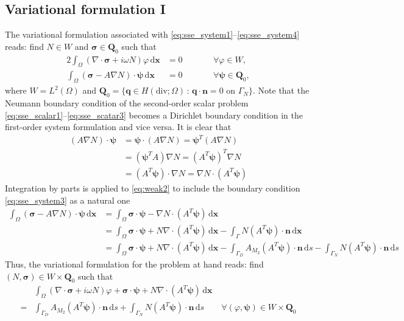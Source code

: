 \documentclass[11pt,a4paper]{article}
\begin{document}
\subsection{Variational formulation I}
The variational formulation associated with \eqref{eq:sse_system1}--\eqref{eq:sse_system4} reads: find $N\in W$ and $\boldsymbol{\sigma}\in\mathbf{Q}_0$ such that 
\begin{alignat}{2}
\int_\Omega\left(\nabla\cdot\boldsymbol{\sigma}+i\omega N\right)\varphi\,\mathrm{d}\mathbf{x}&=0 \qquad && \forall \varphi\in W,
\label{eq:weak1}\\
\int_\Omega\left(\boldsymbol{\sigma}-A\nabla N\right)\cdot\boldsymbol{\psi}\,\mathrm{d}\mathbf{x}&=0 \qquad && \forall \boldsymbol{\psi}\in \mathbf{Q}_0,
\label{eq:weak2}
\end{alignat}
where $W=L^2(\Omega)$ and $\mathbf{Q}_0=\{\mathbf{q}\in H(\text{div};\Omega)\,:\,\mathbf{q}\cdot\mathbf{n}=0 \text{ on }\Gamma_N\}$. Note that the Neumann boundary condition of the second-order scalar problem \eqref{eq:sse_scalar1}--\eqref{eq:sse_scatar3} becomes a Dirichlet boundary condition in the first-order system formulation and vice versa. It is clear that
\begin{align}
(A\nabla N)\cdot\boldsymbol{\psi}
&=\boldsymbol{\psi}\cdot(A\nabla N)
=\boldsymbol{\psi}^T(A\nabla N)\\
&=(\boldsymbol{\psi}^TA)\nabla N
=(A^T\boldsymbol{\psi})^T\nabla N\\
&=(A^T\boldsymbol{\psi})\cdot\nabla N
=\nabla N\cdot(A^T\boldsymbol{\psi})
\end{align}
Integration by parts is applied to \eqref{eq:weak2} to include the boundary condition \eqref{eq:sse_system3} as a natural one
\begin{align*}
\int_\Omega(\boldsymbol{\sigma}-A\nabla N)\cdot\boldsymbol{\psi}\,\mathrm{d}\mathbf{x}
&=\int_\Omega\boldsymbol{\sigma}\cdot\boldsymbol{\psi}-\nabla N\cdot(A^T\boldsymbol{\psi})\,\mathrm{d}\mathbf{x}\\
&=\int_\Omega\boldsymbol{\sigma}\cdot\boldsymbol{\psi}+N\nabla\cdot(A^T\boldsymbol{\psi})\,\mathrm{d}\mathbf{x}-\int_\Gamma N(A^T\boldsymbol{\psi})\cdot\mathbf{n}\,\mathrm{d}\mathbf{x}\\
&=\int_\Omega\boldsymbol{\sigma}\cdot\boldsymbol{\psi}+N\nabla\cdot(A^T\boldsymbol{\psi})\,\mathrm{d}\mathbf{x}-\int_{\Gamma_D} A_{M_2}(A^T\boldsymbol{\psi})\cdot\mathbf{n}\,\mathrm{d}s-\int_{\Gamma_N} N(A^T\boldsymbol{\psi})\cdot\mathbf{n}\,\mathrm{d}s
\end{align*}
Thus, the variational formulation for the problem at hand reads: find $(N,\boldsymbol{\sigma})\in W\times\mathbf{Q}_0$ such that
\begin{align}
&\int_\Omega\left(\nabla\cdot\boldsymbol{\sigma}+i\omega N\right)\varphi+\boldsymbol{\sigma}\cdot\boldsymbol{\psi}+N\nabla\cdot(A^T\boldsymbol{\psi})\,\mathrm{d}\mathbf{x}\\
=&\int_{\Gamma_D} A_{M_2}(A^T\boldsymbol{\psi})\cdot\mathbf{n}\,\mathrm{d}s+\int_{\Gamma_N} N(A^T\boldsymbol{\psi})\cdot\mathbf{n}\,\mathrm{d}s \qquad \forall (\varphi,\boldsymbol{\psi})\in W\times\mathbf{Q}_0
\end{align}
\end{document}
